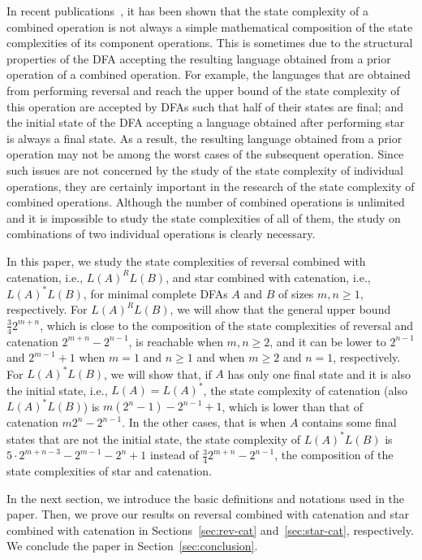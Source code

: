 \documentclass[10pt]{article}
\begin{document}
In recent
publications~\cite{CGKY10-cat-sr,CGKY10-cat-ui,EGLY2009,GaSaYu08,GaYu09,GaYu10,JiOk07,LiMaSaYu08,SaSaYu07},
it has been shown that the state complexity of a combined operation
is not always a simple mathematical composition of the state
complexities of its component operations.
This is sometimes due to the structural properties of the DFA accepting the resulting language obtained from a prior operation of a combined operation.
For example, the languages that are obtained from performing reversal and reach the upper bound of the state complexity of this operation are accepted by DFAs such that half of their states are final; and the initial state of the DFA accepting a language obtained after performing star is always a final state.
As a result, the resulting language obtained from a prior operation may not be among the worst cases of the subsequent operation.
Since such issues are not concerned by the study of the state complexity of individual operations, they are certainly important in the research of the state complexity of combined operations.
Although the number of combined operations is unlimited and it is impossible to study the state complexities of all of them, the study on combinations of two individual operations is clearly necessary.

In this paper, we study the state complexities of reversal combined with catenation, i.e., $L(A)^R L(B)$, and star combined with catenation, i.e., $L(A)^*L(B)$, for minimal complete DFAs $A$ and $B$ of sizes $m,n \ge 1$, respectively.
For $L(A)^R L(B)$, we will show that the general upper bound $\frac{3}{4}2^{m+n}$, which is close to the composition of the state complexities of reversal and catenation $2^{m+n} - 2^{n-1}$, is reachable when $m,n \ge 2$, and it can be lower to $2^{n-1}$ and $2^{m-1}+1$ when $ m = 1$ and $n \ge 1$ and when $m \ge 2$ and $n = 1$, respectively.
For $L(A)^*L(B)$, we will show that, if $A$ has only one final state and it is also the initial state, i.e., $L(A) = L(A)^*$, the state complexity of catenation (also $L(A)^*L(B)$) is $m(2^n-1)-2^{n-1}+1$, which is lower than that of catenation $m2^n - 2^{n-1}$.
In the other cases, that is when $A$ contains some final states that are not the initial state, the state complexity of $L(A)^*L(B)$ is $5 \cdot 2^{m+n-3} - 2^{m-1} - 2^n +1$ instead of $\frac{3}{4}2^{m+n} - 2^{n-1}$, the composition of the state complexities of star and catenation.

In the next section, we introduce the basic definitions and notations used in the paper.
Then, we prove our results on reversal combined with catenation and star combined with catenation in Sections~\ref{sec:rev-cat} and~\ref{sec:star-cat}, respectively.
We conclude the paper in Section~\ref{sec:conclusion}.
\end{document}
